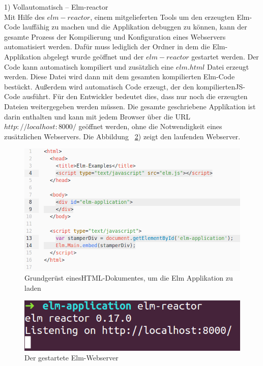 1) Vollautomatisch – Elm-reactor\\
Mit Hilfe des $elm-reactor$, einem mitgelieferten Tools um den erzeugten Elm-Code lauffähig zu machen und die Applikation debuggen zu können, kann der gesamte Prozess der Kompilierung und Konfiguration eines Webservers automatisiert werden. Dafür muss lediglich der Ordner in dem die Elm-Applikation abgelegt wurde geöffnet und der $elm-reactor$ gestartet werden. 
Der Code kann automatisch kompiliert und zusätzlich eine $elm.html$ Datei erzeugt werden. Diese Datei wird dann mit dem gesamten kompilierten Elm-Code bestückt. Außerdem wird automatisch Code erzeugt, der den kompilierten\ac{JS}-Code ausführt. Für den Entwickler bedeutet dies, dass nur noch die erzeugten Dateien weitergegeben werden müssen. Die gesamte geschriebene Applikation ist darin enthalten und kann mit jedem Browser über die URL $http://localhost:8000/$ geöffnet werden, ohne die Notwendigkeit eines zusätzlichen Webservers. Die Abbildung ~\ref{fig:elm-reactor}) zeigt den laufenden Webserver.
\begin{figure}[hb]
\centering
\includegraphics[scale=0.4]{img/elm-make_include_in_index.png}
\caption{Grundgerüst eines\ac{HTML}-Dokumentes, um die Elm Applikation zu laden}\label{fig:html-boilerplate}
\end{figure}
\begin{figure}[t]
\centering
\includegraphics[scale=0.4]{img/elm-reactor.png}
\caption{Der gestartete Elm-Webserver}\label{fig:elm-reactor}
\end{figure}
